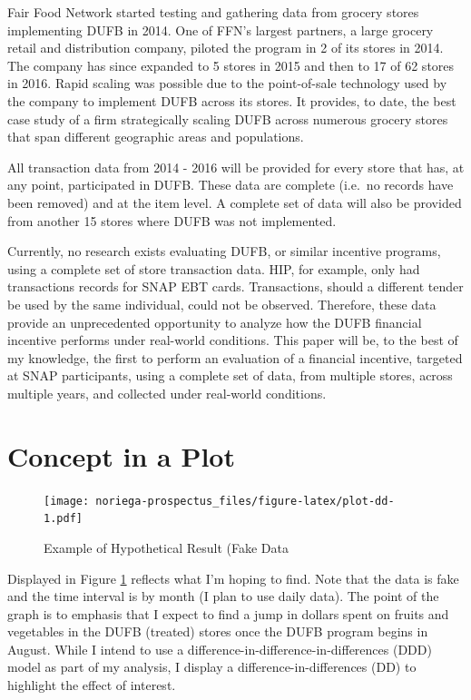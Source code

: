 \documentclass[12pt,letterpaperpaper,]{book}
\begin{document}
Fair Food Network started testing and gathering data from grocery stores
implementing DUFB in 2014. One of FFN's largest partners, a large
grocery retail and distribution company, piloted the program in 2 of its
stores in 2014. The company has since expanded to 5 stores in 2015 and
then to 17 of 62 stores in 2016. Rapid scaling was possible due to the
point-of-sale technology used by the company to implement DUFB across
its stores. It provides, to date, the best case study of a firm
strategically scaling DUFB across numerous grocery stores that span
different geographic areas and populations.

All transaction data from 2014 - 2016 will be provided for every store
that has, at any point, participated in DUFB. These data are complete
(i.e.~no records have been removed) and at the item level. A complete
set of data will also be provided from another 15 stores where DUFB was
not implemented.

Currently, no research exists evaluating DUFB, or similar incentive
programs, using a complete set of store transaction data. HIP, for
example, only had transactions records for SNAP EBT cards. Transactions,
should a different tender be used by the same individual, could not be
observed. Therefore, these data provide an unprecedented opportunity to
analyze how the DUFB financial incentive performs under real-world
conditions. This paper will be, to the best of my knowledge, the first
to perform an evaluation of a financial incentive, targeted at SNAP
participants, using a complete set of data, from multiple stores, across
multiple years, and collected under real-world conditions.

\newpage

\section*{Concept in a Plot}\label{concept-in-a-plot}

\begin{figure}
\centering
\texttt{[image: noriega-prospectus\_files/figure-latex/plot-dd-1.pdf]}
\caption{\label{fig:plot-dd}Example of Hypothetical Result (Fake Data}
\end{figure}

Displayed in Figure \ref{fig:plot-dd} reflects what I'm hoping to find.
Note that the data is fake and the time interval is by month (I plan to
use daily data). The point of the graph is to emphasis that I expect to
find a jump in dollars spent on fruits and vegetables in the DUFB
(treated) stores once the DUFB program begins in August. While I intend
to use a difference-in-difference-in-differences (DDD) model as part of
my analysis, I display a difference-in-differences (DD) to highlight the
effect of interest.
\end{document}
